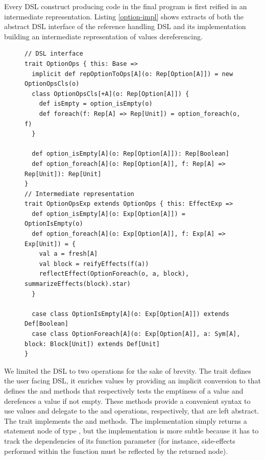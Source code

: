 \documentclass[american,english,runningheads]{llncs}
\begin{document}
Every DSL construct producing code in the final program is first reified in an intermediate representation. Listing
\ref{option-impl} shows extracts of both the abstract DSL interface of the  reference handling DSL and its
implementation building an intermediate representation of values dereferencing.

\begin{figure}
\begin{lstlisting}[caption=Null reference handling DSL,label=option-impl]
// DSL interface
trait OptionOps { this: Base =>
  implicit def repOptionToOps[A](o: Rep[Option[A]]) = new OptionOpsCls(o)
  class OptionOpsCls[+A](o: Rep[Option[A]]) {
    def isEmpty = option_isEmpty(o)
    def foreach(f: Rep[A] => Rep[Unit]) = option_foreach(o, f)
  }
  
  def option_isEmpty[A](o: Rep[Option[A]]): Rep[Boolean]
  def option_foreach[A](o: Rep[Option[A]], f: Rep[A] => Rep[Unit]): Rep[Unit]
}
// Intermediate representation
trait OptionOpsExp extends OptionOps { this: EffectExp =>
  def option_isEmpty[A](o: Exp[Option[A]]) = OptionIsEmpty(o)
  def option_foreach[A](o: Exp[Option[A]], f: Exp[A] => Exp[Unit]) = {
    val a = fresh[A]
    val block = reifyEffects(f(a))
    reflectEffect(OptionForeach(o, a, block), summarizeEffects(block).star)
  }
  
  case class OptionIsEmpty[A](o: Exp[Option[A]]) extends Def[Boolean]
  case class OptionForeach[A](o: Exp[Option[A]], a: Sym[A], block: Block[Unit]) extends Def[Unit]
}
\end{lstlisting}
\end{figure}

We limited the DSL to two operations for the sake of brevity. The  trait defines the user facing DSL,
it enriches  values by providing an implicit conversion to  that defines the
 and  methods that respectively tests the emptiness of a value and derefences a value if
not empty. These methods provide a convenient syntax to use  values and delegate to the
 and  operations, respectively, that are left abstract. The
 trait implements the  and  methods.
The  implementation simply returns a statement node of type , but the
 implementation is more subtle because it has to track the dependencies of its function
parameter  (for instance, side-effects performed within the  function must be reflected by the
returned  node).
\end{document}
